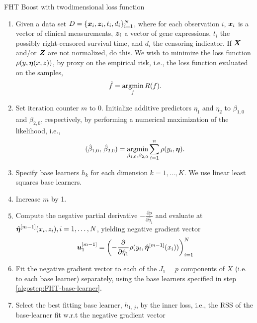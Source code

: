 \begin{algorithm}
\caption{FHT Boost with twodimensional loss function}
\label{algo:fhtboost}
\begin{enumerate}
    \item
        Given a data set $D=\{\bm{x}_i, \bm{z}_i, t_i,d_i\}_{i=1}^N$, where for each observation $i$, $\bm{x}_i$ is a vector of clinical measurements,
        $\bm{z}_i$ a vector of gene expressions, $t_i$ the possibly right-censored survival time, and $d_i$ the censoring indicator. 
        If $\bm{X}$ and/or $\bm{Z}$ are not normalized, do this.
        We wish to minimize the loss function $\rho(y,\boldsymbol{\eta}(x,z))$, by proxy on the empirical risk, i.e., the loss function evaluated on the samples,
        \begin{equation}
            \hat{f}=\operatorname*{argmin}_{f}R(f).
        \end{equation}
    \item
        Set iteration counter $m$ to $0$.
        Initialize additive predictors $\eta_1$ and $\eta_2$ to $\beta_{1,0}$ and $\beta_{2,0}$, respectively, by performing a numerical maximization of the likelihood, i.e.,
        \begin{equation}
            (\hat{\beta}_{1,0},\,\hat{\beta}_{2,0})=\operatorname*{argmin}_{\beta_{1,0},\beta_{2,0}}\sum_{i=1}^n\rho(y_i,\boldsymbol{\eta}).
        \end{equation}
    \item\label{algostep:FHT-base-learner}
        Specify base learners $h_k$ for each dimension $k=1,\ldots,K$.
        We use linear least squares base learners.
    \item\label{algostep:FHT-init}
        Increase $m$ by 1.
    \item
        Compute the negative partial derivative $-\frac{\partial\rho}{\partial \hat{\eta}_1}$
        and evaluate at $\hat{\boldsymbol{\eta}}^{[m-1]}(x_i,z_i),i=1,\ldots,N$, yielding negative gradient vector
        \begin{equation}
            \bm{u}^{[m-1]}_1=\left(-\frac{\partial}{\partial \hat{\eta}_1}\rho(y_i, \hat{\boldsymbol{\eta}}^{[m-1]}(x_i))\right)_{i=1}^N
        \end{equation}
    \item
        Fit the negative gradient vector to each of the $J_1=p$ components of $X$ (i.e. to each base learner) separately, using the base learners specified in step \ref{algostep:FHT-base-learner}.
    \item
        Select the best fitting base learner, $h_{1,\,j}$, by the inner loss,
        i.e., the RSS of the base-learner fit w.r.t the negative gradient vector

\end{enumerate}
\end{algorithm}
